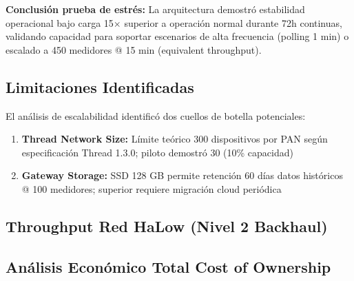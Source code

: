 \textbf{Conclusión prueba de estrés:} La arquitectura demostró estabilidad operacional bajo carga 15$\times$ superior a operación normal durante 72h continuas, validando capacidad para soportar escenarios de alta frecuencia (polling 1 min) o escalado a 450 medidores @ 15 min (equivalent throughput).

\subsection{Limitaciones Identificadas}
\label{sec:res-limitaciones}

El análisis de escalabilidad identificó dos cuellos de botella potenciales:

\begin{enumerate}
    \item \textbf{Thread Network Size:} Límite teórico 300 dispositivos por PAN según especificación Thread 1.3.0; piloto demostró 30 (10\% capacidad)
    \item \textbf{Gateway Storage:} SSD 128 GB permite retención 60 días datos históricos @ 100 medidores; superior requiere migración cloud periódica
\end{enumerate}

\subsection{Throughput Red HaLow (Nivel 2 Backhaul)}
\label{sec:res-throughput-halow}



\subsection{Análisis Económico Total Cost of Ownership}
\label{sec:res-analisis-economico}


